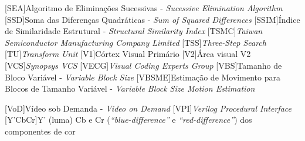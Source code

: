 \begin{acronym}
[SEA]{Algoritmo de Eliminações Sucessivas - \textit{Sucessive Elimination Algorithm}}
[SSD]{Soma das Diferenças Quadráticas - \textit{Sum of Squared Differences}}
[SSIM]{Índice de Similaridade Estrutural - \textit{Structural Similarity Index}}
[TSMC]{\textit{Taiwan Semiconductor Manufacturing Company Limited}}
[TSS]{\textit{Three-Step Search}}
[TU]{\textit{Transform Unit}}
[V1]{Córtex Visual Primário}
[V2]{Área visual V2}
[VCS]{\textit{Synopsys VCS}}
[VECG]{\textit{Visual Coding Experts Group}}
[VBS]{Tamanho de Bloco Variável - \textit{Variable Block Size}}
[VBSME]{Estimação de Movimento para Blocos de Tamanho Variável - \textit{Variable Block Size Motion Estimation}}

[VoD]{Vídeo sob Demanda - \textit{Video on Demand}}
[VPI]{\textit{Verilog Procedural Interface}}
[Y'CbCr]{Y' (luma) Cb e Cr (\textit{``blue-difference''} e \textit{``red-difference''}) dos componentes de cor}


\renewcommand{\baselinestretch}{1}%
\large\normalsize%

\end{acronym}
